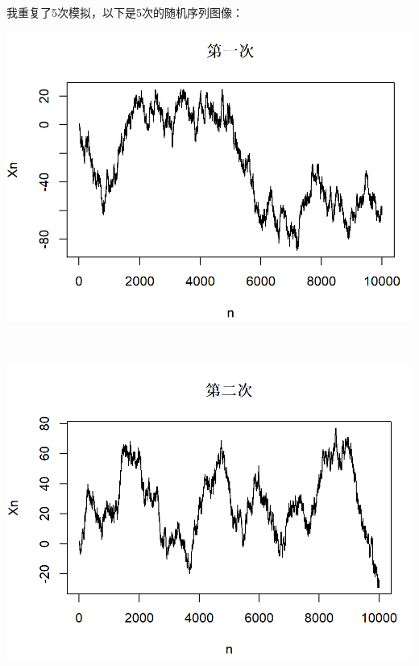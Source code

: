 \documentclass{article}
\begin{document}
\begin{CJK}{UTF8}{gbsn}
\subsection{}
我重复了5次模拟，以下是5次的随机序列图像：
\\
\begin{minipage}{0.5\textwidth}
    \includegraphics[scale=0.6]{random1.png}
\end{minipage}
\\
\begin{minipage}{0.5\textwidth}
    \includegraphics[scale=0.6]{random2.png}
\end{minipage}
\\
\begin{minipage}{0.5\textwidth}

\end{minipage}
\end{CJK}
\end{document}
